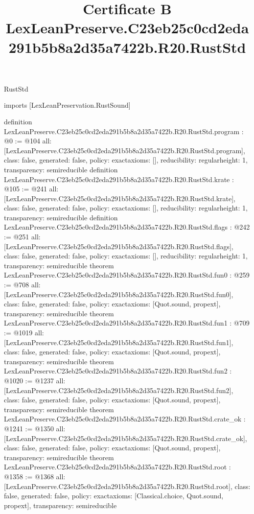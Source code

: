 \begin{lexlean}{RustStd}
\title{Certificate B LexLeanPreserve.C23eb25c0cd2eda291b5b8a2d35a7422b.R20.RustStd}
\begin{coremodule}
imports [LexLeanPreservation.RustSound]

definition LexLeanPreserve.C23eb25c0cd2eda291b5b8a2d35a7422b.R20.RustStd.program : @0 := @104 {
  all: [LexLeanPreserve.C23eb25c0cd2eda291b5b8a2d35a7422b.R20.RustStd.program],
  class: false,
  generated: false,
  policy: exact{axioms: []},
  reducibility: regular{height: 1},
  transparency: semireducible
}
definition LexLeanPreserve.C23eb25c0cd2eda291b5b8a2d35a7422b.R20.RustStd.krate : @105 := @241 {
  all: [LexLeanPreserve.C23eb25c0cd2eda291b5b8a2d35a7422b.R20.RustStd.krate],
  class: false,
  generated: false,
  policy: exact{axioms: []},
  reducibility: regular{height: 1},
  transparency: semireducible
}
definition LexLeanPreserve.C23eb25c0cd2eda291b5b8a2d35a7422b.R20.RustStd.flags : @242 := @251 {
  all: [LexLeanPreserve.C23eb25c0cd2eda291b5b8a2d35a7422b.R20.RustStd.flags],
  class: false,
  generated: false,
  policy: exact{axioms: []},
  reducibility: regular{height: 1},
  transparency: semireducible
}
theorem LexLeanPreserve.C23eb25c0cd2eda291b5b8a2d35a7422b.R20.RustStd.fun0 : @259 := @708 {
  all: [LexLeanPreserve.C23eb25c0cd2eda291b5b8a2d35a7422b.R20.RustStd.fun0],
  class: false,
  generated: false,
  policy: exact{axioms: [Quot.sound, propext]},
  transparency: semireducible
}
theorem LexLeanPreserve.C23eb25c0cd2eda291b5b8a2d35a7422b.R20.RustStd.fun1 : @709 := @1019 {
  all: [LexLeanPreserve.C23eb25c0cd2eda291b5b8a2d35a7422b.R20.RustStd.fun1],
  class: false,
  generated: false,
  policy: exact{axioms: [Quot.sound, propext]},
  transparency: semireducible
}
theorem LexLeanPreserve.C23eb25c0cd2eda291b5b8a2d35a7422b.R20.RustStd.fun2 : @1020 := @1237 {
  all: [LexLeanPreserve.C23eb25c0cd2eda291b5b8a2d35a7422b.R20.RustStd.fun2],
  class: false,
  generated: false,
  policy: exact{axioms: [Quot.sound, propext]},
  transparency: semireducible
}
theorem LexLeanPreserve.C23eb25c0cd2eda291b5b8a2d35a7422b.R20.RustStd.crate_ok : @1241 := @1350 {
  all: [LexLeanPreserve.C23eb25c0cd2eda291b5b8a2d35a7422b.R20.RustStd.crate_ok],
  class: false,
  generated: false,
  policy: exact{axioms: [Quot.sound, propext]},
  transparency: semireducible
}
theorem LexLeanPreserve.C23eb25c0cd2eda291b5b8a2d35a7422b.R20.RustStd.root : @1358 := @1368 {
  all: [LexLeanPreserve.C23eb25c0cd2eda291b5b8a2d35a7422b.R20.RustStd.root],
  class: false,
  generated: false,
  policy: exact{axioms: [Classical.choice, Quot.sound, propext]},
  transparency: semireducible
}


\end{coremodule}
\end{lexlean}

